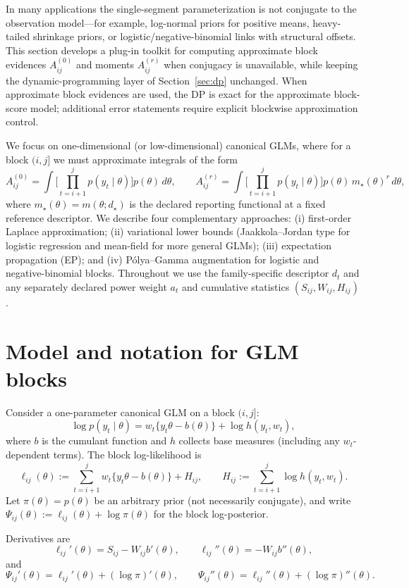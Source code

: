 In many applications the single-segment parameterization is not conjugate to the observation
model---for example, log-normal priors for positive means, heavy-tailed shrinkage priors, or
logistic/negative-binomial links with structural offsets. This section develops a plug-in
toolkit for computing approximate block evidences $A^{(0)}_{ij}$ and moments $A^{(r)}_{ij}$
when conjugacy is unavailable, while keeping the dynamic-programming layer of
Section~\ref{sec:dp} unchanged. When approximate block evidences are used, the DP is exact for
the approximate block-score model; additional error statements require explicit blockwise
approximation control.

We focus on one-dimensional (or low-dimensional) canonical GLMs, where for a block $(i,j]$ we
must approximate integrals of the form
\[
A^{(0)}_{ij}
 = \int \Big[\prod_{t=i+1}^j p(y_t\mid\theta)\Big] p(\theta)\,d\theta,\qquad
A^{(r)}_{ij}
 = \int \Big[\prod_{t=i+1}^j p(y_t\mid\theta)\Big] p(\theta)\,m_\star(\theta)^r\,d\theta,
\]
where $m_\star(\theta)=m(\theta;d_\star)$ is the declared reporting functional at a fixed reference descriptor. We describe four complementary approaches:
(i) first-order Laplace approximation; (ii) variational lower bounds (Jaakkola--Jordan \citep{jaakkola2000logisticvb} type
for logistic regression and mean-field for more general GLMs); (iii) expectation propagation
(EP); and (iv) P\'olya--Gamma augmentation for logistic and negative-binomial blocks. Throughout
we use the family-specific descriptor $d_t$ and any separately declared power weight $a_t$ and cumulative statistics $(S_{ij},W_{ij},H_{ij})$.

\section{Model and notation for GLM blocks}

Consider a one-parameter canonical GLM on a block $(i,j]$:
\[
\log p(y_t\mid\theta)
 = w_t\big\{ y_t\theta - b(\theta)\big\} + \log h(y_t,w_t),
\]
where $b$ is the cumulant function and $h$ collects base measures (including any $w_t$-dependent
terms). The block log-likelihood is
\[
\ell_{ij}(\theta)
 := \sum_{t=i+1}^j w_t\{y_t\theta - b(\theta)\} + H_{ij},
\qquad
H_{ij}:=\sum_{t=i+1}^j \log h(y_t,w_t).
\]
Let $\pi(\theta)=p(\theta)$ be an arbitrary prior (not necessarily conjugate), and write
$\Psi_{ij}(\theta):=\ell_{ij}(\theta)+\log\pi(\theta)$ for the block log-posterior.

Derivatives are
\[
\ell_{ij}'(\theta) = S_{ij} - W_{ij} b'(\theta),\qquad
\ell_{ij}''(\theta) = -W_{ij} b''(\theta),
\]
and
\[
\Psi_{ij}'(\theta) = \ell_{ij}'(\theta) + (\log\pi)'(\theta),\qquad
\Psi_{ij}''(\theta) = \ell_{ij}''(\theta) + (\log\pi)''(\theta).
\]

